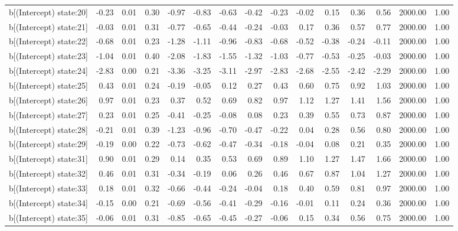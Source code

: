 \begin{table}[ht]
\begin{tabular}{rrrrrrrrrrrrrrr}
  b[(Intercept) state:20] & -0.23 & 0.01 & 0.30 & -0.97 & -0.83 & -0.63 & -0.42 & -0.23 & -0.02 & 0.15 & 0.36 & 0.56 & 2000.00 & 1.00 \\ 
  b[(Intercept) state:21] & -0.03 & 0.01 & 0.31 & -0.77 & -0.65 & -0.44 & -0.24 & -0.03 & 0.17 & 0.36 & 0.57 & 0.77 & 2000.00 & 1.00 \\ 
  b[(Intercept) state:22] & -0.68 & 0.01 & 0.23 & -1.28 & -1.11 & -0.96 & -0.83 & -0.68 & -0.52 & -0.38 & -0.24 & -0.11 & 2000.00 & 1.00 \\ 
  b[(Intercept) state:23] & -1.04 & 0.01 & 0.40 & -2.08 & -1.83 & -1.55 & -1.32 & -1.03 & -0.77 & -0.53 & -0.25 & -0.03 & 2000.00 & 1.00 \\ 
  b[(Intercept) state:24] & -2.83 & 0.00 & 0.21 & -3.36 & -3.25 & -3.11 & -2.97 & -2.83 & -2.68 & -2.55 & -2.42 & -2.29 & 2000.00 & 1.00 \\ 
  b[(Intercept) state:25] & 0.43 & 0.01 & 0.24 & -0.19 & -0.05 & 0.12 & 0.27 & 0.43 & 0.60 & 0.75 & 0.92 & 1.03 & 2000.00 & 1.00 \\ 
  b[(Intercept) state:26] & 0.97 & 0.01 & 0.23 & 0.37 & 0.52 & 0.69 & 0.82 & 0.97 & 1.12 & 1.27 & 1.41 & 1.56 & 2000.00 & 1.00 \\ 
  b[(Intercept) state:27] & 0.23 & 0.01 & 0.25 & -0.41 & -0.25 & -0.08 & 0.08 & 0.23 & 0.39 & 0.55 & 0.73 & 0.87 & 2000.00 & 1.00 \\ 
  b[(Intercept) state:28] & -0.21 & 0.01 & 0.39 & -1.23 & -0.96 & -0.70 & -0.47 & -0.22 & 0.04 & 0.28 & 0.56 & 0.80 & 2000.00 & 1.00 \\ 
  b[(Intercept) state:29] & -0.19 & 0.00 & 0.22 & -0.73 & -0.62 & -0.47 & -0.34 & -0.18 & -0.04 & 0.08 & 0.21 & 0.35 & 2000.00 & 1.00 \\ 
  b[(Intercept) state:31] & 0.90 & 0.01 & 0.29 & 0.14 & 0.35 & 0.53 & 0.69 & 0.89 & 1.10 & 1.27 & 1.47 & 1.66 & 2000.00 & 1.00 \\ 
  b[(Intercept) state:32] & 0.46 & 0.01 & 0.31 & -0.34 & -0.19 & 0.06 & 0.26 & 0.46 & 0.67 & 0.87 & 1.04 & 1.27 & 2000.00 & 1.00 \\ 
  b[(Intercept) state:33] & 0.18 & 0.01 & 0.32 & -0.66 & -0.44 & -0.24 & -0.04 & 0.18 & 0.40 & 0.59 & 0.81 & 0.97 & 2000.00 & 1.00 \\ 
  b[(Intercept) state:34] & -0.15 & 0.00 & 0.21 & -0.69 & -0.56 & -0.41 & -0.29 & -0.16 & -0.01 & 0.11 & 0.24 & 0.36 & 2000.00 & 1.00 \\ 
  b[(Intercept) state:35] & -0.06 & 0.01 & 0.31 & -0.85 & -0.65 & -0.45 & -0.27 & -0.06 & 0.15 & 0.34 & 0.56 & 0.75 & 2000.00 & 1.00 \\ 

\end{tabular}
\end{table}
